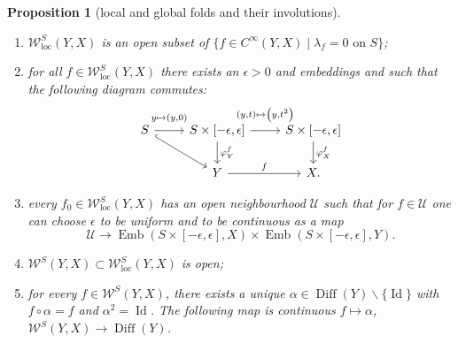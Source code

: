 \documentclass[10pt,a4paper]{amsart}
\numberwithin{equation}{section}
\newtheorem{Proposition}[Theorem]{Proposition}
\theoremstyle{definition}
\newcommand{\1}{{\bf 1}}
\newcommand{\Id}{\operatorname{Id}}
\newcommand{\loc}{\mathrm{loc}}
\DeclareMathOperator{\Diff}{Diff}
\begin{document}
\begin{Proposition}[local and global folds and their involutions] \
	\begin{enumerate}[label=\rm(\roman*)]\itemsep=0pt
		\item $\mathcal W_\loc^S(Y,X)$ is an open subset of $\{f\in C^\infty(Y,X)\mid \lambda_f = 0\text{ on } S\}$;
		
		\item for all $f\in \mathcal W_\loc^S(Y,X)$ there exists an $\epsilon>0$ and embeddings  and 
		such that the following diagram commutes:
		\[
		 	\begin{tikzcd}
		 		S \arrow["{y\mapsto (y,0)}"{yshift=1ex}]{r} \arrow[hookrightarrow]{rd} & S\times [-\epsilon,\epsilon] \arrow["{(y,t)\mapsto \bigl(y,t^2\bigr)}"{yshift=1ex}]{r} \arrow["{\varphi^f_Y}"]{d} & S\times [-\epsilon,\epsilon] \arrow["{\varphi^f_X}"]{d}\\
		 		& Y \arrow["{f}"]{r} & X.
		 	\end{tikzcd}
		\]
		\item every $f_0\in \mathcal W_\loc^S(Y,X)$ has an open neighbourhood $\mathcal U$ such that for $f\in \mathcal U$ one can choose $\epsilon$ to be uniform and  to be continuous as a map
		\[
		\mathcal U\to \operatorname{Emb}(S\times [-\epsilon,\epsilon],X) \times \operatorname{Emb}(S\times [-\epsilon,\epsilon],Y).
		\]
		\item $\mathcal W^S(Y,X)\subset \mathcal W^S_\loc(Y,X)$ is open;
		
		
		\item for every $f\in \mathcal W^S(Y,X)$, there exists a unique $\alpha \in \Diff(Y)\backslash \{\Id\}$ with $f\circ \alpha = f$ and $\alpha^2 = \Id$. The following map is continuous $f\mapsto \alpha$, $ \mathcal W^S(Y,X) \to \Diff(Y)$.
		
		
			\end{enumerate}
\end{Proposition}
\end{document}
